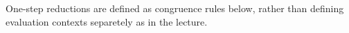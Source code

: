 \documentclass[a4paper,11pt]{article}
\begin{document}
\begin{AgdaAlign}
\begin{code}
\AgdaOperator{\AgdaFunction{]}}\<%
\end{code}
One-step reductions are defined as congruence rules below, rather than defining evaluation contexts separetely as in the lecture.
\begin{code}%
%
\>[4]\AgdaSpace{}%
\AgdaSymbol{:}\AgdaSpace{}%
\AgdaSymbol{\{}\AgdaSpace{}%
\AgdaSpace{}%
\AgdaSymbol{:}\AgdaSpace{}%
\AgdaSpace{}%
\AgdaSpace{}%
\AgdaSpace{}%
\AgdaSymbol{(}\AgdaSpace{}%
\AgdaSpace{}%
\AgdaSpace{}%
\AgdaOperator{\AgdaInductiveConstructor{!}}\AgdaSpace{}%
\AgdaSymbol{)\}}\<%
\\
\>[4][@{}l@{\AgdaIndent{0}}]%
\>[6]\AgdaSpace{}%
\AgdaSpace{}%
\AgdaSpace{}%
\<%
\\
%
\>[6]\AgdaSpace{}%
\AgdaSpace{}%
\AgdaSymbol{\{}\AgdaSymbol{\}}\AgdaSpace{}%
\AgdaSpace{}%
\AgdaSpace{}%
\AgdaSpace{}%
\AgdaSpace{}%
\AgdaSpace{}%
\AgdaSpace{}%
\AgdaSpace{}%
\<%
\\
%
\\[\AgdaEmptyExtraSkip]%
%
\>[4]\AgdaSpace{}%
\AgdaSymbol{:}\AgdaSpace{}%
\AgdaSpace{}%
\AgdaSymbol{\{}\AgdaSpace{}%
\AgdaSymbol{:}\AgdaSpace{}%
\AgdaSpace{}%
\AgdaSpace{}%
\AgdaSpace{}%
\AgdaSymbol{(}\AgdaSpace{}%
\AgdaSpace{}%
\AgdaSpace{}%
\AgdaOperator{\AgdaInductiveConstructor{!}}\AgdaSpace{}%
\AgdaSymbol{)\}}\AgdaSpace{}%
\AgdaSymbol{(}\AgdaSpace{}%
\AgdaSymbol{:}\AgdaSpace{}%
\AgdaSpace{}%
\AgdaSymbol{)}\AgdaSpace{}%
\AgdaSymbol{\{}\AgdaSpace{}%
\AgdaSymbol{\}}\<%
\\
\>[4][@{}l@{\AgdaIndent{0}}]%
\>[6]\AgdaSpace{}%
\AgdaSpace{}%
\AgdaSpace{}%
\<%
\\
%
\>[6]\AgdaSpace{}%
\AgdaSpace{}%
\AgdaSpace{}%

\end{code}
\end{AgdaAlign}
\end{document}
